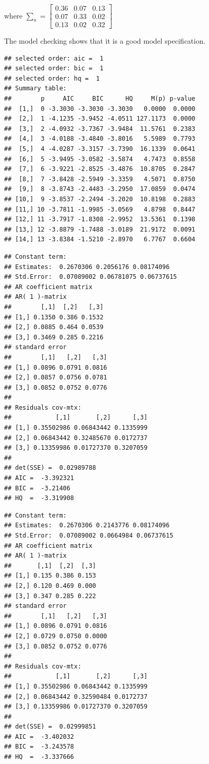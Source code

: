 \documentclass[]{article}
\begin{document}
where
\(\sum_{a} = \left[\begin{array}{rrr}0.36 & 0.07 & 0.13\\0.07 & 0.33 & 0.02 \\ 0.13 & 0.02 & 0.32\end{array}\right]\)

The model checking shows that it is a good model specification.

\begin{verbatim}
## selected order: aic =  1 
## selected order: bic =  1 
## selected order: hq =  1 
## Summary table:  
##        p     AIC     BIC      HQ     M(p) p-value
##  [1,]  0 -3.3030 -3.3030 -3.3030   0.0000  0.0000
##  [2,]  1 -4.1235 -3.9452 -4.0511 127.1173  0.0000
##  [3,]  2 -4.0932 -3.7367 -3.9484  11.5761  0.2383
##  [4,]  3 -4.0188 -3.4840 -3.8016   5.5989  0.7793
##  [5,]  4 -4.0287 -3.3157 -3.7390  16.1339  0.0641
##  [6,]  5 -3.9495 -3.0582 -3.5874   4.7473  0.8558
##  [7,]  6 -3.9221 -2.8525 -3.4876  10.8705  0.2847
##  [8,]  7 -3.8428 -2.5949 -3.3359   4.5071  0.8750
##  [9,]  8 -3.8743 -2.4483 -3.2950  17.0859  0.0474
## [10,]  9 -3.8537 -2.2494 -3.2020  10.8198  0.2883
## [11,] 10 -3.7811 -1.9985 -3.0569   4.8798  0.8447
## [12,] 11 -3.7917 -1.8308 -2.9952  13.5361  0.1398
## [13,] 12 -3.8879 -1.7488 -3.0189  21.9172  0.0091
## [14,] 13 -3.8384 -1.5210 -2.8970   6.7767  0.6604
\end{verbatim}

\begin{verbatim}
## Constant term: 
## Estimates:  0.2670306 0.2056176 0.08174096 
## Std.Error:  0.07089002 0.06781075 0.06737615 
## AR coefficient matrix 
## AR( 1 )-matrix 
##        [,1]  [,2]   [,3]
## [1,] 0.1350 0.386 0.1532
## [2,] 0.0885 0.464 0.0539
## [3,] 0.3469 0.285 0.2216
## standard error 
##        [,1]   [,2]   [,3]
## [1,] 0.0896 0.0791 0.0816
## [2,] 0.0857 0.0756 0.0781
## [3,] 0.0852 0.0752 0.0776
##   
## Residuals cov-mtx: 
##            [,1]       [,2]      [,3]
## [1,] 0.35502986 0.06843442 0.1335999
## [2,] 0.06843442 0.32485670 0.0172737
## [3,] 0.13359986 0.01727370 0.3207059
##   
## det(SSE) =  0.02989788 
## AIC =  -3.392321 
## BIC =  -3.21406 
## HQ  =  -3.319908
\end{verbatim}

\begin{verbatim}
## Constant term: 
## Estimates:  0.2670306 0.2143776 0.08174096 
## Std.Error:  0.07089002 0.0664984 0.06737615 
## AR coefficient matrix 
## AR( 1 )-matrix 
##       [,1]  [,2]  [,3]
## [1,] 0.135 0.386 0.153
## [2,] 0.120 0.469 0.000
## [3,] 0.347 0.285 0.222
## standard error 
##        [,1]   [,2]   [,3]
## [1,] 0.0896 0.0791 0.0816
## [2,] 0.0729 0.0750 0.0000
## [3,] 0.0852 0.0752 0.0776
##   
## Residuals cov-mtx: 
##            [,1]       [,2]      [,3]
## [1,] 0.35502986 0.06843442 0.1335999
## [2,] 0.06843442 0.32590484 0.0172737
## [3,] 0.13359986 0.01727370 0.3207059
##   
## det(SSE) =  0.02999851 
## AIC =  -3.402032 
## BIC =  -3.243578 
## HQ  =  -3.337666
\end{verbatim}
\end{document}
